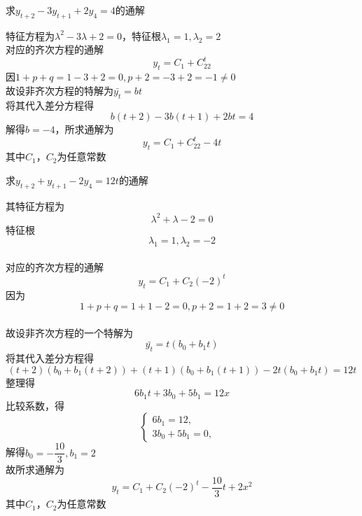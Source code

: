 \documentclass[color=green,titlestyle=hang]{elegantbook}%
\begin{document}
\begin{example}
求$y_{t+2}-3y_{t+1}+2y_4=4$的通解\\[-4mm]
\end{example}\begin{solution}
特征方程为$\lambda^2-3\lambda+2=0$，特征根$\lambda_1=1,\lambda_2=2$\\
对应的齐次方程的通解\begin{equation*}y_t=C_1+C_22^t\end{equation*}
因$1+p+q=1-3+2=0,p+2=-3+2=-1\neq0$\\
故设非齐次方程的特解为$\bar{y_t}=bt$\\
将其代入差分方程得\begin{equation*}b(t+2)-3b(t+1)+2bt=4\end{equation*}
解得$b=-4$，所求通解为\begin{equation*}y_t=C_1+C_22^t-4t\end{equation*}
其中$C_1$，$C_2$为任意常数
\end{solution}

\begin{example}
求$y_{t+2}+y_{t+1}-2y_4=12t$的通解\\[-4mm]
\end{example}\begin{solution}
其特征方程为\begin{equation*}\lambda^2+\lambda-2=0\end{equation*}
特征根\begin{equation*}\lambda_1=1,\lambda_2=-2\end{equation*}\\
对应的齐次方程的通解\begin{equation*}y_t=C_1+C_2(-2)^t\end{equation*}
因为\begin{equation*}1+p+q=1+1-2=0,p+2=1+2=3\neq0\end{equation*}\\
故设非齐次方程的一个特解为\begin{equation*}\bar{y_t}=t(b_0+b_1t)\end{equation*}
将其代入差分方程得
\begin{equation*}(t+2)(b_0+b_1(t+2))+(t+1)(b_0+b_1(t+1))-2t(b_0+b_1t)=12t\end{equation*}
整理得\begin{equation*}6b_1t+3b_0+5b_1=12x\end{equation*}
比较系数，得\begin{equation*}\begin{cases}6b_1=12,&\\3b_0+5b_1=0,\end{cases}\end{equation*}		
解得$b_0=-\dfrac{10}{3},b_1=2$\\故所求通解为\begin{equation*}y_t=C_1+C_2(-2)^t-\frac{10}{3}t+2x^2\end{equation*}
其中$C_1$，$C_2$为任意常数
\end{solution}
\end{document}
